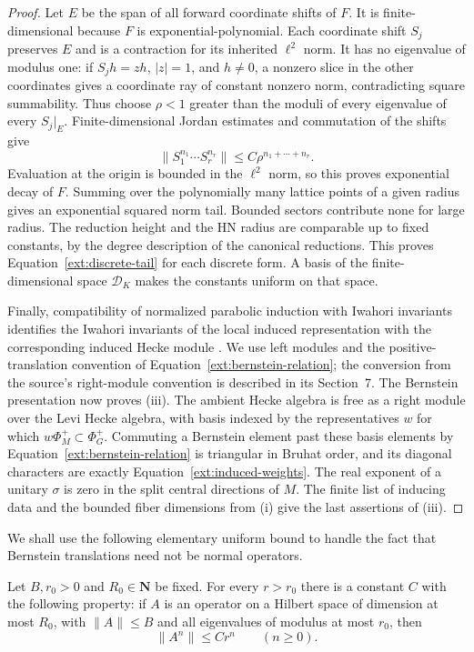 \begin{proof}
 Let $E$ be the span of all forward coordinate shifts of $F$.
 It is finite-dimensional because $F$ is exponential-polynomial.
 Each coordinate shift $S_j$ preserves $E$ and is a contraction for
 its inherited $\ell^2$ norm.  It has no eigenvalue of modulus one:
 if $S_jh=zh$, $|z|=1$, and $h\ne0$, a nonzero slice in the other
 coordinates gives a coordinate ray of constant nonzero norm,
 contradicting square summability.  Thus choose $\rho<1$ greater
 than the moduli of every eigenvalue of every $S_j|_E$.
 Finite-dimensional Jordan estimates and commutation of the shifts
 give
 \[
   \|S_1^{n_1}\cdots S_r^{n_r}\|\le C\rho^{n_1+\cdots+n_r}.
 \]
 Evaluation at the origin is bounded in the $\ell^2$ norm, so this
 proves exponential decay of $F$.  Summing over the polynomially
 many lattice points of a given radius gives an exponential squared
 norm tail.  Bounded sectors contribute none for large radius.
 The reduction height and the HN radius are comparable up to fixed
 constants, by the degree description of the canonical reductions.
 This proves Equation~\eqref{ext:discrete-tail} for each discrete form.
 A basis of the finite-dimensional space $\mathcal D_K$ makes the
 constants uniform on that space.

 Finally, compatibility of normalized parabolic induction with Iwahori
 invariants identifies the Iwahori invariants of the local induced representation with the
 corresponding induced Hecke module
 \cite[Section~5.8, Theorem~8]{PrasadBernstein}.
 We use left modules and the positive-translation convention of
 Equation~\eqref{ext:bernstein-relation}; the conversion from the
 source's right-module convention is described in its Section~7.
 The Bernstein presentation now proves (iii). The ambient Hecke
 algebra is free as a right module over the Levi Hecke algebra,
 with basis indexed by the representatives $w$ for which
 $w\Phi_M^+\subset\Phi_G^+$.  Commuting a Bernstein element past these
 basis elements by Equation~\eqref{ext:bernstein-relation} is triangular
 in Bruhat order, and its diagonal characters are exactly
 Equation~\eqref{ext:induced-weights}.  The real exponent of a unitary
 $\sigma$ is zero in the split central directions of $M$.  The finite
 list of inducing data and the bounded fiber dimensions from (i)
 give the last assertions of (iii).
\end{proof}

We shall use the following elementary uniform bound to handle the fact
that Bernstein translations need not be normal operators.

\begin{lemma}\label{ext:matrix-bound}
 Let $B,r_0>0$ and $R_0\in\mathbf N$ be fixed.  For every $r>r_0$ there
 is a constant $C$ with the following property: if $A$ is an operator
 on a Hilbert space of dimension at most $R_0$, with
 $\|A\|\le B$ and all eigenvalues of modulus at most $r_0$, then
 \[
       \|A^n\|\le Cr^n\qquad(n\ge0).
 \]
\end{lemma}

